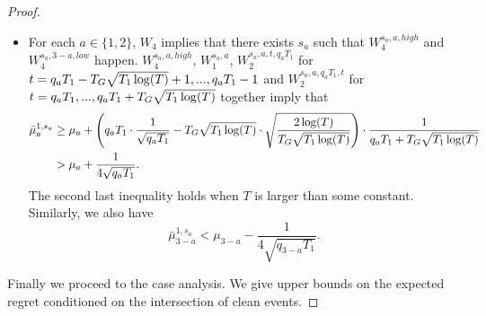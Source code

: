 \begin{proof}
{\begin{itemize}
If there are at least $T_2$ pulls of arm $a$ in the first two levels, 
\[
|\bar{\mu}_a-\mu_a| \leq \sqrt{\frac{2\log(T)}{T_2}}. 
\]

\item For each $a \in \{1,2\}$, $W_4$ implies that there exists $s_a$ such that $W_4^{s_a,a,high}$ and $W_4^{s_a,3-a,low}$ happen. $W_4^{s_a,a,high}$,  $W_1^{s_a,a}$, $W_2^{s_a,a,t, q_aT_1}$ for $t = q_a T_1- T_G \sqrt{T_1\log(T)}+1, ...,q_aT_1-1$ and $W_2^{s_a,a,q_aT_1,t}$ for $t= q_aT_1,...,q_a T_1+ T_G \sqrt{T_1\log(T)}$ together imply that 
\begin{align*}
\bar{\mu}_a ^{1,s_a} &\geq \mu_a + \left(q_aT_1 \cdot \frac{1}{\sqrt{q_aT_1}} - T_G \sqrt{T_1\log(T)} \cdot \sqrt{\frac{2\log(T)}{ T_G \sqrt{T_1\log(T)}}} \right) \cdot \frac{1}{q_a T_1+ T_G \sqrt{T_1\log(T)}} \\
&> \mu_a + \frac{1}{4\sqrt{q_aT_1}}.
\end{align*}
The second last inequality holds when $T$ is larger than some constant.
Similarly, we also have
\[
\bar{\mu}_{3-a} ^{1,s_a} < \mu_{3-a}   - \frac{1}{4\sqrt{q_{3-a} T_1}}.
\]
\end{itemize}
}
Finally we proceed to the case analysis. We give upper bounds on the expected regret conditioned on the intersection of clean events.

\end{proof}

